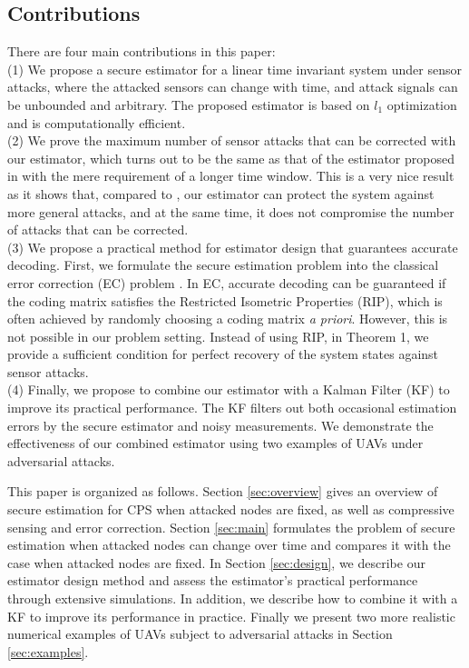 \documentclass[../../thesis.tex]{subfiles}
\begin{document}

\subsection{Contributions}

There are four main contributions in this paper:\\
(1) We propose a secure estimator for a linear time invariant system under sensor attacks, where the attacked sensors can change with time, and attack signals can be unbounded and arbitrary.
The proposed estimator is based on $l_1$ optimization and is computationally efficient.\\
(2) We prove the maximum number of sensor attacks that can be corrected with our estimator, which turns out to be the same as that of the estimator proposed in \cite{Fawzi:2014} with the mere requirement of a longer time window. This is a very nice result as it shows that, compared to \cite{Fawzi:2014}, our estimator can protect the system against more general attacks, and at the same time, it does not compromise the number of attacks that can be corrected.\\
(3) We propose a practical method for estimator design that guarantees accurate decoding. 
First, we formulate the secure estimation problem into the classical error correction (EC) problem \cite{tao11}. In EC, accurate decoding can be guaranteed if the coding matrix satisfies the Restricted Isometric Properties (RIP), {which is often achieved by randomly choosing a coding matrix \textit{a priori}. 
However, this is not possible in our problem setting. }
Instead of using RIP, in Theorem 1, we provide a sufficient condition for perfect recovery of the system states against sensor attacks.\\
(4) 
Finally, we propose to combine our estimator with a Kalman Filter (KF) to improve its practical performance. 
The KF filters out both occasional estimation errors by the secure estimator and noisy measurements.
We demonstrate the effectiveness of our combined estimator using two examples of UAVs under adversarial attacks.

This paper is organized as follows. Section \ref{sec:overview} gives an overview of secure estimation for CPS when attacked nodes are fixed, as well as compressive sensing and error correction. Section \ref{sec:main} formulates the problem of secure estimation when attacked nodes can change over time and compares it with the case when attacked nodes are fixed. In Section \ref{sec:design}, we describe our estimator design method and assess the estimator's practical performance through extensive simulations. In addition, we describe how to combine it with a KF to improve its performance in practice. Finally we present two more realistic numerical examples of UAVs subject to adversarial attacks in Section \ref{sec:examples}. 
\end{document}
